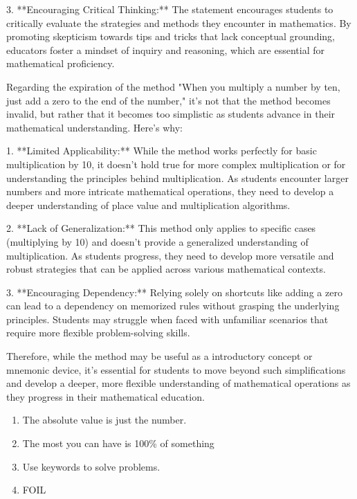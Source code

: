 \documentclass[11pt]{article}
\theoremstyle{definition}\newtheorem{definition}{Definition}
\theoremstyle{definition}\newtheorem{question}{Question}
\theoremstyle{definition}\newtheorem*{solution}{Solution}
\theoremstyle{definition}\newtheorem{example}{Example}
\theoremstyle{definition}\newtheorem{notation}{Notation}
\theoremstyle{theorem}\newtheorem{theorem}{Theorem}
\theoremstyle{theorem}\newtheorem{corollary}{Corollary}
\theoremstyle{theorem}\newtheorem{lemma}{Lemma}
\theoremstyle{theorem}\newtheorem{proposition}{Proposition}
\theoremstyle{theorem}\newtheorem{prompt}{Prompt}
\begin{document}
3. **Encouraging Critical Thinking:** The statement encourages students to critically evaluate the strategies and methods they encounter in mathematics. By promoting skepticism towards tips and tricks that lack conceptual grounding, educators foster a mindset of inquiry and reasoning, which are essential for mathematical proficiency.

Regarding the expiration of the method "When you multiply a number by ten, just add a zero to the end of the number," it's not that the method becomes invalid, but rather that it becomes too simplistic as students advance in their mathematical understanding. Here's why:

1. **Limited Applicability:** While the method works perfectly for basic multiplication by 10, it doesn't hold true for more complex multiplication or for understanding the principles behind multiplication. As students encounter larger numbers and more intricate mathematical operations, they need to develop a deeper understanding of place value and multiplication algorithms.

2. **Lack of Generalization:** This method only applies to specific cases (multiplying by 10) and doesn't provide a generalized understanding of multiplication. As students progress, they need to develop more versatile and robust strategies that can be applied across various mathematical contexts.

3. **Encouraging Dependency:** Relying solely on shortcuts like adding a zero can lead to a dependency on memorized rules without grasping the underlying principles. Students may struggle when faced with unfamiliar scenarios that require more flexible problem-solving skills.

Therefore, while the method may be useful as a introductory concept or mnemonic device, it's essential for students to move beyond such simplifications and develop a deeper, more flexible understanding of mathematical operations as they progress in their mathematical education.

\color{black}

\begin{enumerate}
    \item The absolute value is just the number.
    \item The most you can have is 100\% of something
    \item Use keywords to solve problems.
    \item FOIL
\end{enumerate}
\end{document}
